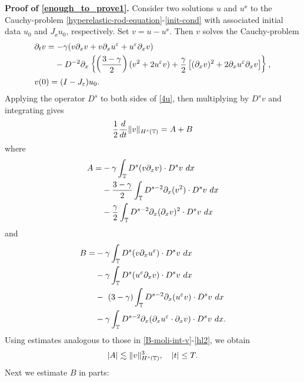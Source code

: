 {\bf Proof of \eqref{enough_to_prove1}.}
Consider two solutions $u $ and $u^\ee$ to the Cauchy-problem
\eqref{hyperelastic-rod-equation}-\eqref{init-cond}
with associated initial data $u_0$ and
$J_\ee u_0$, respectively. Set $v= u -u^\ee $. Then $v$ solves the
Cauchy-problem
\begin{align}
\label{4u}
& \p_t v  =  - \gamma (v \p_x v + v \p_x u^\ee + u^\ee \p_x v)  \\
& \phantom{\p_t v  =} - D^{-2} \p_x \left\{ \left (\frac{3-\gamma}{2} \right )(v^2 +
2u^\ee v) + \frac{\gamma}{2}\left[ (\p_x v)^2 + 2 \p_x u^\ee \p_x v \right]
\right\}, \notag
\\
& v(0) = (I- J_\ee)u_0.
\label{5u}
\end{align}
Applying the operator $D^s$ to both sides of \eqref{4u}, then multiplying by
$D^s v$ and integrating gives
%
%
\begin{equation}
\begin{split}
\frac{1}{2}\frac{d}{dt} \|v\|_{H^s(\mathbb{T})} = A + B
\label{6u}
\end{split}
\end{equation}
%
%
where
%
%
\begin{equation}
\begin{split}
A
 =  & -\gamma \int_{\mathbb{T}} D^s(v \partial_x v) \cdot D^s v \
dx
\\
& - \frac{3- \gamma}{2} \int_{\mathbb{T}} D^{s-2} \partial_x (v^2) \cdot D^s v
\ dx
\\
& - \frac{\gamma}{2}\int_{\mathbb{T}} D^{s-2} \partial_x (\partial_x v)^2 \cdot D^s
v \ dx
\label{7u}
\end{split}
\end{equation}
%
%
and
%
%
\begin{equation}
\begin{split}
B = & -\gamma \int_{\mathbb{T}} D^s (v \partial_x u^\varepsilon ) \cdot D^s v \
dx \\
& -\gamma \int_{\mathbb{T}} D^s (u^\varepsilon \partial_x v) \cdot D^s v \
dx
\\
& - \ ( 3- \gamma) \int_{\mathbb{T}} D^{s-2} \partial_x (u^\varepsilon v) \cdot D^s
v \ dx
\\
& -\gamma \int_{\mathbb{T}} D^{s-2} \partial_x
(\partial_x u^\varepsilon \cdot \partial_x v) \cdot D^s v \
dx.
\label{8u}
\end{split}
\end{equation}
%
%
Using estimates analogous to those in 
\eqref{B-moli-int-v}-\eqref{hl2}, we 
obtain 
%
%
\begin{equation}
\begin{split}
|A| \lesssim \|v\|_{H^s(\mathbb{T})}^3, \quad |t| \le T.
\label{8'u}
\end{split}
\end{equation}
%
%
%
Next we estimate $B$ in parts:
%
%
%
%
%

